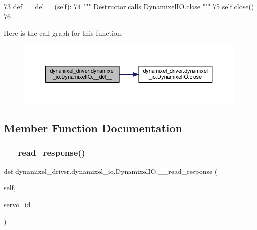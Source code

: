 \begin{DoxyCode}
73     \textcolor{keyword}{def }\_\_del\_\_(self):
74         \textcolor{stringliteral}{""" Destructor calls DynamixelIO.close """}
75         self.close()
76 
\end{DoxyCode}
Here is the call graph for this function\+:
\nopagebreak
\begin{figure}[H]
\begin{center}
\leavevmode
\includegraphics[width=350pt]{dd/d77/classdynamixel__driver_1_1dynamixel__io_1_1_dynamixel_i_o_a2a13aea3e96f34e02926c4395924359e_cgraph}
\end{center}
\end{figure}


\subsection{Member Function Documentation}
\mbox{\label{classdynamixel__driver_1_1dynamixel__io_1_1_dynamixel_i_o_a0e0e863880f961a4dcffb12274db9fa6}} 
\subsubsection{\texorpdfstring{\+\_\+\+\_\+read\+\_\+response()}{\_\_read\_response()}}
{\footnotesize\ttfamily def dynamixel\+\_\+driver.\+dynamixel\+\_\+io.\+Dynamixel\+I\+O.\+\_\+\+\_\+read\+\_\+response (\begin{DoxyParamCaption}\item[{}]{self,  }\item[{}]{servo\+\_\+id }\end{DoxyParamCaption})\hspace{0.3cm}{\ttfamily [private]}}



